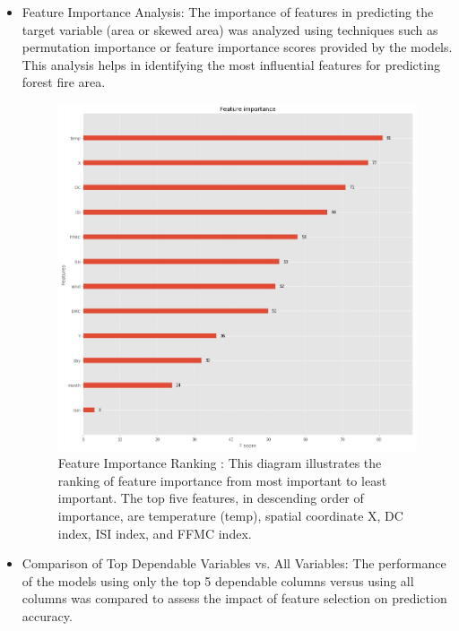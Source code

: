 \begin{itemize}
\item Feature Importance Analysis:
The importance of features in predicting the target variable (area or skewed area) was analyzed using techniques such as permutation importance or feature importance scores provided by the models. This analysis helps in identifying the most influential features for predicting forest fire area.


\begin{figure}[ht]
    \centering
    \includegraphics[scale=0.5]{figures/Feature Ranking.jpg}
    \caption{Feature Importance Ranking : This diagram illustrates the ranking of feature importance from most important to least important. The top five features, in descending order of importance, are temperature (temp), spatial coordinate X, DC index, ISI index, and FFMC index.}
\end{figure}

\item Comparison of Top Dependable Variables vs. All Variables:
The performance of the models using only the top 5 dependable columns versus using all columns was compared to assess the impact of feature selection on prediction accuracy.
\end{itemize}


